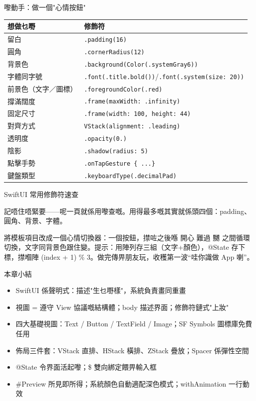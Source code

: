 \begin{tcbpractice}{嚟動手：做一個"心情按鈕"}

\begin{center}
\begin{tabularx}{\linewidth}{|X|X|}
\hline
\textbf{想做乜嘢} & \textbf{修飾符} \tabularnewline
\hline
留白 & \texttt{.\allowbreak padding(16)} \tabularnewline
圓角 & \texttt{.\allowbreak cornerRadius(12)} \tabularnewline
背景色 & \texttt{.\allowbreak background(Color(.\allowbreak systemGray6))} \tabularnewline
字體同字號 & \texttt{.\allowbreak font(.\allowbreak title.\allowbreak bold())}/\texttt{.\allowbreak font(.\allowbreak system(size: 20))} \tabularnewline
前景色（文字／圖標） & \texttt{.\allowbreak foregroundColor(.\allowbreak red)} \tabularnewline
撐滿闊度 & \texttt{.\allowbreak frame(maxWidth: .\allowbreak infinity)} \tabularnewline
固定尺寸 & \texttt{.\allowbreak frame(width: 100, height: 44)} \tabularnewline
對齊方式 & \texttt{VStack(alignment: .\allowbreak leading)} \tabularnewline
透明度 & \texttt{.\allowbreak opacity(0.\allowbreak 6)} \tabularnewline
陰影 & \texttt{.\allowbreak shadow(radius: 5)} \tabularnewline
點擊手勢 & \texttt{.\allowbreak onTapGesture \{ .\allowbreak .\allowbreak .\allowbreak  \}} \tabularnewline
鍵盤類型 & \texttt{.\allowbreak keyboardType(.\allowbreak decimalPad)} \tabularnewline
\hline
\end{tabularx}
\end{center}

\begin{center}\small\color{gray}SwiftUI 常用修飾符速查\end{center}

記唔住唔緊要——呢一頁就係用嚟查嘅。用得最多嘅其實就係頭四個：padding、圓角、背景、字體。

將模板項目改成一個心情切換器：一個按鈕，㩒咗之後喺 開心 難過 嬲 之間循環切換，文字同背景色跟住變。提示：用陣列存三組（文字+顏色），@State 存下標，㩒嗰陣 (index + 1) \% 3。做完傳畀朋友玩，收穫第一波“哇你識做 App 喇”。

\end{tcbpractice}

\begin{tcbsummary}{本章小結}
\begin{itemize}
  \item SwiftUI 係聲明式：描述"生乜嘢樣"，系統負責畫同重畫
  \item 視圖 = 遵守 View 協議嘅結構體；body 描述界面；修飾符鏈式"上妝"
  \item 四大基礎視圖：Text / Button / TextField / Image；SF Symbols 圖標庫免費任用
  \item 佈局三件套：VStack 直排、HStack 橫排、ZStack 疊放；Spacer 係彈性空間
  \item @State 令界面活起嚟；\$ 雙向綁定餵畀輸入框
  \item \#Preview 所見即所得；系統顏色自動適配深色模式；withAnimation 一行動效
\end{itemize}

\end{tcbsummary}
